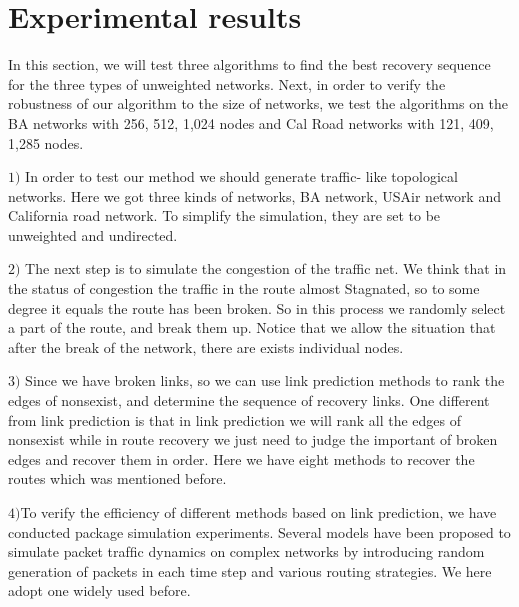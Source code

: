 \documentclass[onecolumn,preprintnumbers,amsmath,amssymb]{revtex4}
\begin{document}
\section*{Experimental results\protect}

In this section, we will test three algorithms to find the best recovery sequence for the three types of unweighted networks.  Next, in order to verify the robustness of our algorithm to the size of networks, we test the algorithms on the BA networks with 256, 512, 1,024 nodes and Cal Road networks with 121, 409, 1,285 nodes.


$1)$ In order to test our method we should generate traffic- like topological networks. Here we got three kinds of networks, BA network, USAir network and California road network. To simplify the simulation, they are set to be unweighted and undirected.

$2)$ The next step is to simulate the congestion of the traffic net. We think that in the status of congestion the traffic in the route almost Stagnated, so to some degree it equals the route has been broken. So in this process we randomly select a part of the route, and break them up. Notice that we allow the situation that after the break of the network, there are exists individual nodes.

$3)$ Since we have broken links, so we can use link prediction methods to rank the edges of nonsexist, and determine the sequence of recovery links. One different from link prediction is that in link prediction we will rank all the edges of nonsexist while in route recovery we just need to judge the important of broken edges and recover them in order. Here we have eight methods to recover the routes which was mentioned before. 

$4)$To verify the efficiency of different methods based on link prediction, we have conducted package simulation experiments. Several models have been proposed to simulate packet trafﬁc dynamics on complex networks by introducing random generation of packets in each time step and various routing strategies. We here adopt one widely used before.
\end{document}

